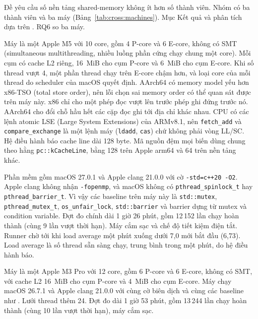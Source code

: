 Đề yêu cầu số nền tảng shared-memory không ít hơn số thành viên. Nhóm có ba thành viên và ba máy
(Bảng~\ref{tab:cross:machines}). Mục Kết quả và phân tích dựa trên . RQ6 so ba máy.

Máy  là một Apple M5 với 10 core, gồm 4 P-core và 6 E-core, không có SMT
(simultaneous multithreading, nhiều luồng phần cứng chạy chung một core). Mỗi cụm có cache L2 riêng,
16~MiB cho cụm P-core và 6~MiB cho cụm E-core. Khi số thread vượt 4, một phần thread chạy trên E-core
chậm hơn, và loại core của mỗi thread do scheduler của macOS quyết định. AArch64 có memory model yếu hơn
x86-TSO (total store order), nên lỗi chọn sai memory order có thể quan sát được trên máy này. x86 chỉ
cho một phép đọc vượt lên trước phép ghi đứng trước nó. AArch64 cho đổi chỗ hầu hết các cặp đọc ghi tới
địa chỉ khác nhau. CPU có các lệnh atomic LSE
(Large System Extensions) của ARMv8.1, nên \texttt{fetch\_add} và \texttt{compare\_exchange} là một lệnh
máy (\texttt{ldadd}, \texttt{cas}) chứ không phải vòng LL/SC. Hệ điều hành báo cache line dài 128 byte.
Mã nguồn đệm mọi biến dùng chung theo hằng \texttt{pc::kCacheLine}, bằng 128 trên Apple arm64 và 64 trên
nền tảng khác.

Phần mềm gồm macOS 27.0.1 và Apple clang 21.0.0 với cờ \texttt{-std=c++20 -O2}. Apple clang không nhận
\texttt{-fopenmp}, và macOS không có \texttt{pthread\_spinlock\_t} hay \texttt{pthread\_barrier\_t}.
Vì vậy các baseline trên máy này là \texttt{std::mutex}, \texttt{pthread\_mutex\_t},
\texttt{os\_unfair\_lock}, \texttt{std::barrier} và barrier dựng từ mutex và condition variable. Đợt đo
chính dài 1 giờ 26 phút, gồm 12\,152 lần chạy hoàn thành (cùng 9 lần vượt thời hạn). Máy cắm sạc và chế độ
tiết kiệm điện tắt. Runner chờ tới khi load average một phút xuống dưới 7,0 mới bắt đầu (6,73). Load average là số thread
sẵn sàng chạy, trung bình trong một phút, do hệ điều hành báo.

Máy  là một Apple M3 Pro với 12 core, gồm 6 P-core và 6 E-core, không có SMT, với
cache L2 16~MiB cho cụm P-core và 4~MiB cho cụm E-core. Máy chạy macOS 26.7.1 và Apple clang 21.0.0 với
cùng cờ biên dịch và cùng các baseline như . Lưới thread thêm 24. Đợt đo dài 1 giờ 53
phút, gồm 13\,244 lần chạy hoàn thành (cùng 10 lần vượt thời hạn), máy cắm sạc.

